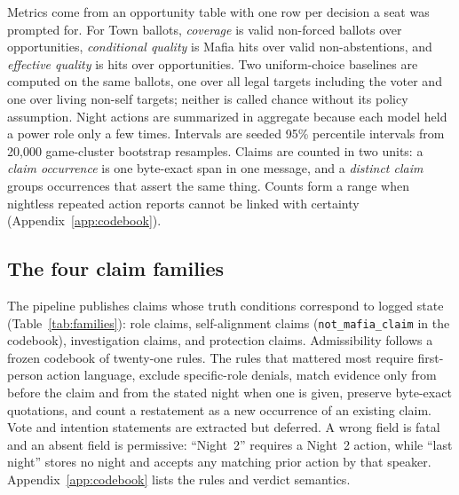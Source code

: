 \documentclass[11pt]{article}
\newcommand{\code}[1]{\texttt{#1}}
\begin{document}
Metrics come from an opportunity table with one row per decision a seat was prompted for. For Town ballots, \emph{coverage} is valid non-forced ballots over opportunities, \emph{conditional quality} is Mafia hits over valid non-abstentions, and \emph{effective quality} is hits over opportunities. Two uniform-choice baselines are computed on the same ballots, one over all legal targets including the voter and one over living non-self targets; neither is called chance without its policy assumption. Night actions are summarized in aggregate because each model held a power role only a few times. Intervals are seeded 95\% percentile intervals from 20,000 game-cluster bootstrap resamples. Claims are counted in two units: a \emph{claim occurrence} is one byte-exact span in one message, and a \emph{distinct claim} groups occurrences that assert the same thing. Counts form a range when nightless repeated action reports cannot be linked with certainty (Appendix~\ref{app:codebook}).

\subsection{The four claim families}

The pipeline publishes claims whose truth conditions correspond to logged state (Table~\ref{tab:families}): role claims, self-alignment claims (\code{not\_mafia\_claim} in the codebook), investigation claims, and protection claims. Admissibility follows a frozen codebook of twenty-one rules. The rules that mattered most require first-person action language, exclude specific-role denials, match evidence only from before the claim and from the stated night when one is given, preserve byte-exact quotations, and count a restatement as a new occurrence of an existing claim. Vote and intention statements are extracted but deferred. A wrong field is fatal and an absent field is permissive: ``Night~2'' requires a Night~2 action, while ``last night'' stores no night and accepts any matching prior action by that speaker. Appendix~\ref{app:codebook} lists the rules and verdict semantics.
\end{document}
